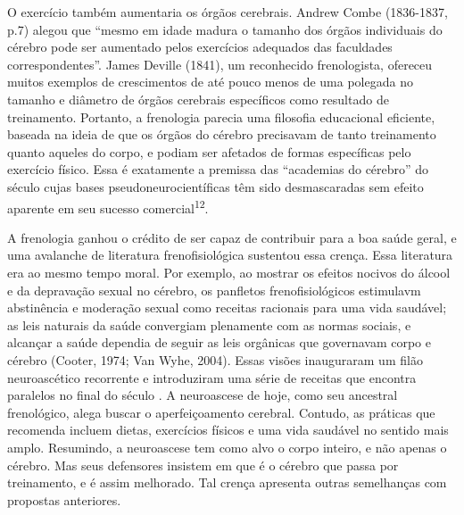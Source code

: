 O exercício também aumentaria os órgãos cerebrais. Andrew Combe
(1836-1837, p.7) alegou que ``mesmo em idade madura o tamanho dos órgãos
individuais do cérebro pode ser aumentado pelos exercícios adequados das
faculdades correspondentes''. James Deville (1841), um reconhecido
frenologista, ofereceu muitos exemplos de crescimentos de até pouco
menos de uma polegada no tamanho e diâmetro de órgãos cerebrais
específicos como resultado de treinamento. Portanto, a frenologia
parecia uma filosofia educacional eficiente, baseada na ideia de que os
órgãos do cérebro precisavam de tanto treinamento quanto aqueles do
corpo, e podiam ser afetados de formas específicas pelo exercício
físico. Essa é exatamente a premissa das ``academias do cérebro'' do
século  cujas bases pseudoneurocientíficas têm sido desmascaradas sem
efeito aparente em seu sucesso comercial\textsuperscript{12}.

A frenologia ganhou o crédito de ser capaz de contribuir para a boa
saúde geral, e uma avalanche de literatura frenofisiológica sustentou
essa crença. Essa literatura era ao mesmo tempo moral. Por exemplo, ao
mostrar os efeitos nocivos do álcool e da depravação sexual no cérebro,
os panfletos frenofisiológicos estimulavm abstinência e moderação sexual
como receitas racionais para uma vida saudável; as leis naturais da
saúde convergiam plenamente com as normas sociais, e alcançar a saúde
dependia de seguir as leis orgânicas que governavam corpo e cérebro
(Cooter, 1974; Van Wyhe, 2004). Essas visões inauguraram um filão
neuroascético recorrente e introduziram uma série de receitas que
encontra paralelos no final do século . A neuroascese de hoje, como
seu ancestral frenológico, alega buscar o aperfeiçoamento cerebral.
Contudo, as práticas que recomenda incluem dietas, exercícios físicos e
uma vida saudável no sentido mais amplo. Resumindo, a neuroascese tem
como alvo o corpo inteiro, e não apenas o cérebro. Mas seus defensores
insistem em que é o cérebro que passa por treinamento, e é assim
melhorado. Tal crença apresenta outras semelhanças com propostas
anteriores.

